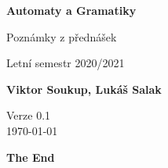 \documentclass[11pt]{article}
\theoremstyle{nontheoremstyle}
\theoremstyle{nontheoremstylenodot}
\theoremstyle{theoremstyle}
\begin{document}
\begin{titlepage}
    \begin{center}
        \vspace*{1cm}
            
        \Huge
        \textbf{Automaty a Gramatiky}
            
        \vspace{0.5cm}
        \LARGE
        Poznámky z přednášek

        \vspace{5mm}
        
        Letní semestr 2020/2021
        
        \vspace{1.5cm}
            
        \textbf{Viktor Soukup, Lukáš Salak}
        
        \vfill
        \flushright
        \normalsize
        Verze 0.1\\
        \today
        
    \end{center}
\end{titlepage}

\tableofcontents
\clearpage





\vfill
\begin{center}
\LARGE
\textbf{The End}
\end{center}
\end{document}
